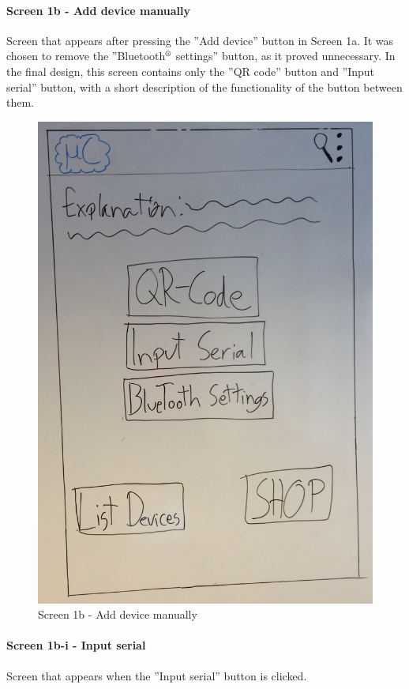 \paragraph{Screen 1b - Add device manually}
Screen that appears after pressing the ''Add device'' button in Screen 1a. It was chosen to remove the ''Bluetooth$\textsuperscript{\textregistered}$ settings'' button, as it proved unnecessary. In the final design, this screen contains only the ''QR code'' button and ''Input serial'' button, with a short description of the functionality of the button between them.

\begin{figure}[H]
\centering
\includegraphics[scale=0.2]{images/Design_guide/Screen1b.png}
\caption{Screen 1b - Add device manually}
\end{figure}


\paragraph{Screen 1b-i - Input serial}
Screen that appears when the ''Input serial'' button is clicked.

